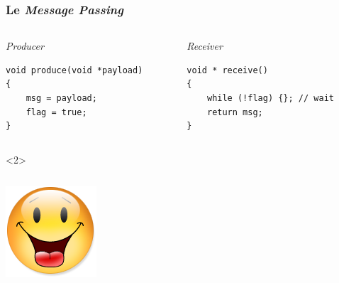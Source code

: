 \documentclass[xcolor={x11names,svgnames}]{beamer}
\begin{document}
\begin{frame}[fragile, label=tso_mp]
  \frametitle{Le \emph{Message Passing} }
  
  \begin{columns}
    \begin{column}{0.5\textwidth}
      \begin{block}{\emph{Producer}}
\begin{verbatim}
void produce(void *payload)
{          
    msg = payload;
    flag = true;
}
\end{verbatim}
      \end{block}
    \end{column}  
    \begin{column}{0.5\textwidth}
      \begin{block}{\emph{Receiver}}
\begin{verbatim}
void * receive()
{  
    while (!flag) {}; // wait
    return msg;
}
\end{verbatim}
      \end{block}
    \end{column}
  \end{columns}

  \begin{overlayarea}{\textwidth}{1cm}
    \begin{onlyenv}<2>
      \begin{columns}[c]
        \begin{column}{.1\textwidth}
          \vspace{1mm}
          \includegraphics[width=\textwidth]{Content.png}
        \end{column}


\end{columns}
\end{onlyenv}
\end{overlayarea}
\end{frame}
\end{document}
